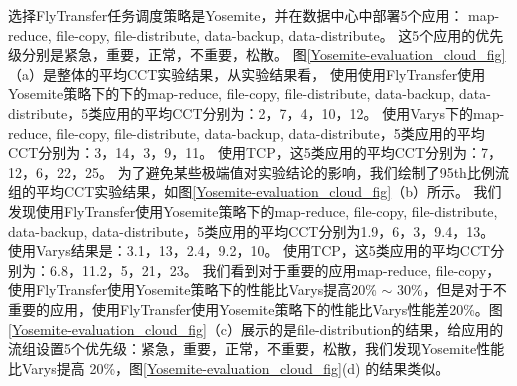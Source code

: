 选择FlyTransfer任务调度策略是Yosemite，并在数据中心中部署5个应用： map-reduce, file-copy, file-distribute, data-backup, data-distribute。
这5个应用的优先级分别是紧急，重要，正常，不重要，松散。
图\ref{Yosemite-evaluation_cloud_fig}（a）是整体的平均CCT实验结果，从实验结果看，
使用使用FlyTransfer使用Yosemite策略下的下的map-reduce, file-copy, file-distribute, data-backup, data-distribute，5类应用的平均CCT分别为：2，7，4，10，12。
使用Varys下的map-reduce, file-copy, file-distribute, data-backup, data-distribute，5类应用的平均CCT分别为：3，14，3，9，11。
使用TCP，这5类应用的平均CCT分别为：7，12，6，22，25。
为了避免某些极端值对实验结论的影响，我们绘制了95th比例流组的平均CCT实验结果，如图\ref{Yosemite-evaluation_cloud_fig}（b）所示。
我们发现使用FlyTransfer使用Yosemite策略下的map-reduce, file-copy, file-distribute, data-backup, data-distribute，5类应用的平均CCT分别为1.9，6，3，9.4，13。
使用Varys结果是：3.1，13，2.4，9.2，10。
使用TCP，这5类应用的平均CCT分别为：6.8，11.2，5，21，23。
我们看到对于重要的应用map-reduce, file-copy，使用FlyTransfer使用Yosemite策略下的性能比Varys提高20\% $ \sim$ 30\%，但是对于不重要的应用，使用FlyTransfer使用Yosemite策略下的性能比Varys性能差20\%。图\ref{Yosemite-evaluation_cloud_fig}（c）展示的是file-distribution的结果，给应用的流组设置5个优先级：紧急，重要，正常，不重要，松散，我们发现Yosemite性能比Varys提高 20\%，图\ref{Yosemite-evaluation_cloud_fig}(d) 的结果类似。

